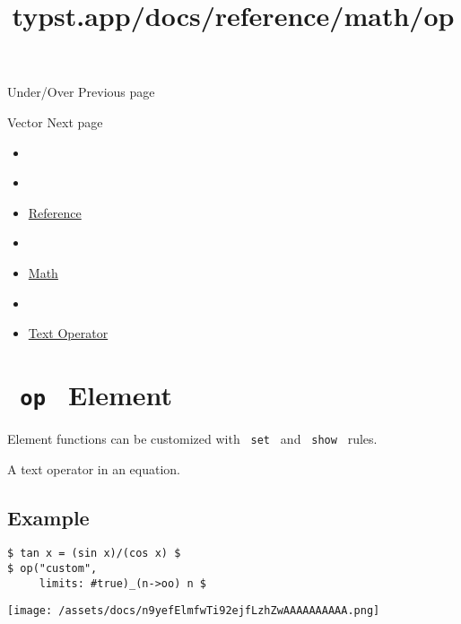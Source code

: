 \href{/docs/reference/math/underover/}{\pandocbounded{}}

{ Under/Over } { Previous page }

\href{/docs/reference/math/vec/}{\pandocbounded{}}

{ Vector } { Next page }


\title{typst.app/docs/reference/math/op}

\begin{itemize}
\tightlist
\item
  \href{/docs}{}
\item
  
\item
  \href{/docs/reference/}{Reference}
\item
  
\item
  \href{/docs/reference/math/}{Math}
\item
  
\item
  \href{/docs/reference/math/op/}{Text Operator}
\end{itemize}

\section{\texorpdfstring{\texttt{\ op\ } {{ Element
}}}{ op   Element }}\label{summary}

\label{element-tooltip}
Element functions can be customized with \texttt{\ set\ } and
\texttt{\ show\ } rules.

A text operator in an equation.

\subsection{Example}\label{example}

\begin{verbatim}
$ tan x = (sin x)/(cos x) $
$ op("custom",
     limits: #true)_(n->oo) n $
\end{verbatim}

\texttt{[image: /assets/docs/n9yefElmfwTi92ejfLzhZwAAAAAAAAAA.png]}

